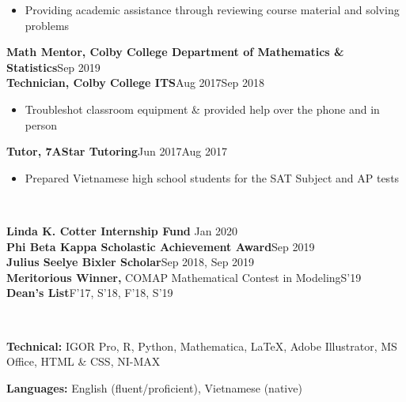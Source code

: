 \documentclass[letter, 9pt]{article}
\newcommand{\longunderline}[1]{\uline{#1\hfill\mbox{}}}
\begin{document}
	\begin{itemize}[noitemsep, nolistsep]
		\item Providing academic assistance through reviewing course material and solving problems
	\end{itemize}
	\textbf{Math Mentor, Colby College Department of Mathematics \& Statistics}\hfill Sep 2019\textemdash \\	  
	\noindent \textbf{Technician, Colby College ITS}\hfill Aug 2017\textemdash Sep 2018
	\begin{itemize}[noitemsep, nolistsep]
		\item Troubleshot classroom equipment \& provided help over the phone and in person
	\end{itemize}
	  \textbf{Tutor, 7AStar Tutoring}\hfill Jun 2017\textemdash Aug 2017
	\begin{itemize}[noitemsep, nolistsep]
		\item Prepared Vietnamese high school students for the SAT Subject and AP tests\\
	\end{itemize}

	\vspace{-7pt} \noindent \longunderline{\normalsize{{\color{colby}{\textbf{HONORS, AWARDS, FUNDS}}}}}\\ \vspace{-7pt}
			
		\noindent \textbf{Linda K. Cotter Internship Fund} \hfill Jan 2020\\
		\noindent \textbf{Phi Beta Kappa Scholastic Achievement Award}\hfill Sep 2019 \\
		\noindent \textbf{Julius Seelye Bixler Scholar}\hfill Sep 2018, Sep 2019\\
		\noindent \textbf{Meritorious Winner,} {COMAP} Mathematical Contest in Modeling\hfill S'19\\
		\noindent \textbf{Dean's List}\hfill F'17, S'18, F'18, S'19\\
		 \vspace{-7pt}
	
	
	\noindent \longunderline{\normalsize{{}}}
	\\ \vspace{-7pt}
	
	\noindent \textbf{Technical:} IGOR Pro, R, Python, Mathematica, \LaTeX{}, Adobe Illustrator, MS Office,  HTML \& CSS, NI-MAX
	
	\noindent \textbf{Languages:} English (fluent/proficient), Vietnamese (native)\\
	\vspace{-7pt}
	
\end{document}
